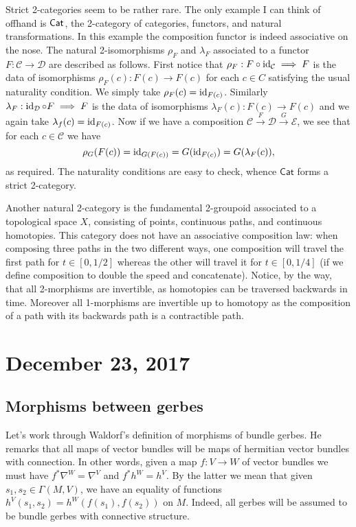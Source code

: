 \documentclass{amsart}
\begin{document}
Strict 2-categories seem to be rather rare. The only example I can think of offhand
is $\sf Cat$, the 2-category of categories, functors, and natural transformations.
In this example the composition functor is indeed associative on the nose. The
natural 2-isomorphisms $\rho_F$ and $\lambda_F$ associated to a functor $F:\mathcal{C}\to\mathcal{D}$
are described as follows. First notice that $\rho_F:F\circ\operatorname{id}_\mathcal{C}\implies F$
is the data of isomorphisms $\rho_F(c):F(c)\to F(c)$ for each $c\in C$ satisfying
the usual naturality condition. We simply take $\rho_F(c) = \operatorname{id}_{F(c)}$. Similarly
$\lambda_F:\operatorname{id}_\mathcal{D}\circ F\implies F$ is the data of isomorphisms
$\lambda_F(c):F(c)\to F(c)$ and we again take $\lambda_f(c)=\operatorname{id}_{F(c)}$. Now if
we have a composition $\mathcal{C}\xrightarrow{F}\mathcal{D}\xrightarrow{G}\mathcal{E}$,
we see that for each $c\in \mathcal{C}$ we have
\begin{equation*}
    \rho_G(F(c)) = \operatorname{id}_{G(F(c))} = G(\operatorname{id}_{F(c)}) = G(\lambda_F(c)),
\end{equation*}
as required. The naturality conditions are easy to check, whence $\mathsf{Cat}$ forms a strict 2-category.

Another natural 2-category is the fundamental 2-groupoid associated to a topological space $X$,
consisting of points, continuous paths, and continuous homotopies. This category does not
have an associative composition law: when composing three paths in the two different ways,
one composition will travel the first path for $t\in[0,1/2]$ whereas the other will travel
it for $t\in[0,1/4]$ (if we define composition to double the speed and concatenate). Notice,
by the way, that all 2-morphisms are invertible, as homotopies can be traversed backwards in time.
Moreover all 1-morphisms are invertible up to homotopy as the composition of a path
with its backwards path is a contractible path.

\section{December 23, 2017}

\subsection{Morphisms between gerbes}

Let's work through Waldorf's definition of morphisms of bundle gerbes. He
remarks that all maps of vector bundles will be maps of hermitian vector bundles
with connection. In other words, given a map $f:V\to W$ of vector bundles we must
have $f^*\nabla^W=\nabla^V$ and $f^*h^W=h^V$. By the latter we mean that given
$s_1,s_2\in\Gamma(M, V)$, we have an equality of functions $h^V(s_1,s_2)=h^W(f(s_1),f(s_2))$
on $M$. Indeed, all gerbes will be assumed to be bundle gerbes with connective structure.
\end{document}
